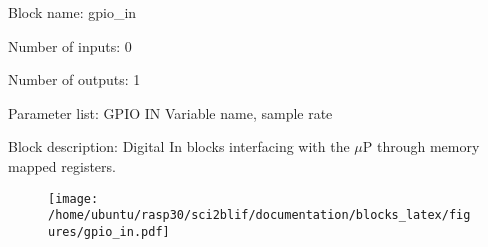 \pagebreak

Block name: gpio\_in

Number of inputs: 0

Number of outputs: 1

Parameter list: GPIO IN Variable name, sample rate

Block description: 
Digital In blocks interfacing with the $\mu$P through memory mapped registers.

\begin{figure}[H]  %
\texttt{[image: /home/ubuntu/rasp30/sci2blif/documentation/blocks\_latex/figures/gpio\_in.pdf]}
\end{figure}

